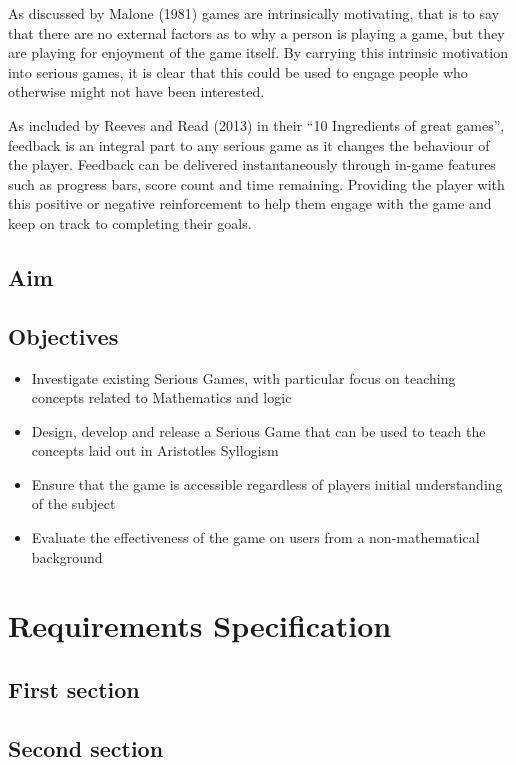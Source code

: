 \documentclass[12pt,a4paper]{report}
\begin{document}
As discussed by Malone (1981) games are intrinsically motivating, that is to say that there are no external factors as to why a person is playing a game, but they are playing for enjoyment of the game itself. By carrying this intrinsic motivation into serious games, it is clear that this could be used to engage people who otherwise might not have been interested. 

As included by Reeves and Read (2013) in their “10 Ingredients of great games”, feedback is an integral part to any serious game as it changes the behaviour of the player. Feedback can be delivered instantaneously through in-game features such as progress bars, score count and time remaining. Providing the player with this positive or negative reinforcement to help them engage with the game and keep on track to completing their goals. 


\section{Aim}
\section{Objectives}
\begin{itemize}
  \item Investigate existing Serious Games, with particular focus on teaching concepts related to Mathematics and logic

  \item Design, develop and release a Serious Game that can be used to teach the concepts laid out in Aristotle\textsc{}s Syllogism
  \item Ensure that the game is accessible regardless of players initial understanding of the subject
  \item Evaluate the effectiveness of the game on users from a non-mathematical background
  
\end{itemize}
\chapter{Requirements Specification}
\section{First section}
\section{Second section}
\end{document}
